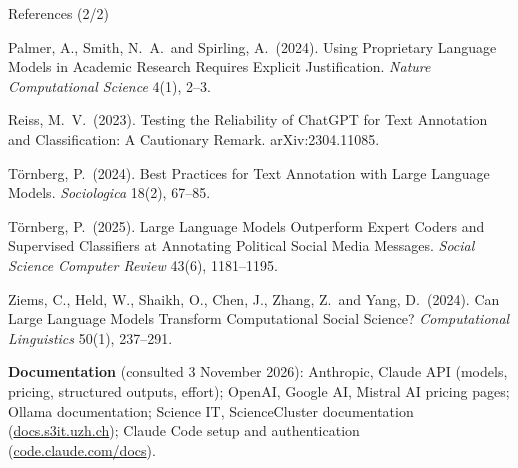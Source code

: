 \begin{frame}{References (2/2)}

{\scriptsize

Palmer, A., Smith, N.\ A.\ and Spirling, A.\ (2024). Using Proprietary Language Models in Academic Research Requires Explicit Justification. \textit{Nature Computational Science} 4(1), 2--3.

\vspace{0.08cm}

Reiss, M.\ V.\ (2023). Testing the Reliability of ChatGPT for Text Annotation and Classification: A Cautionary Remark. arXiv:2304.11085.

\vspace{0.08cm}

T\"ornberg, P.\ (2024). Best Practices for Text Annotation with Large Language Models. \textit{Sociologica} 18(2), 67--85.

\vspace{0.08cm}

T\"ornberg, P.\ (2025). Large Language Models Outperform Expert Coders and Supervised Classifiers at Annotating Political Social Media Messages. \textit{Social Science Computer Review} 43(6), 1181--1195.

\vspace{0.08cm}

Ziems, C., Held, W., Shaikh, O., Chen, J., Zhang, Z.\ and Yang, D.\ (2024). Can Large Language Models Transform Computational Social Science? \textit{Computational Linguistics} 50(1), 237--291.

\vspace{0.15cm}

\textbf{Documentation} (consulted 3 November 2026): Anthropic, Claude API (models, pricing, structured outputs, effort); OpenAI, Google AI, Mistral AI pricing pages; Ollama documentation; Science IT, ScienceCluster documentation (\href{https://docs.s3it.uzh.ch}{\textcolor{titleblue}{docs.s3it.uzh.ch}}); Claude Code setup and authentication (\href{https://code.claude.com/docs}{\textcolor{titleblue}{code.claude.com/docs}}).

}

\end{frame}

